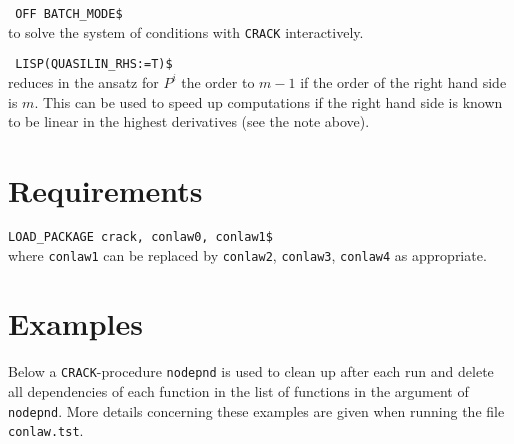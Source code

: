 \documentclass[12pt]{article}
\begin{document}
\verb+ OFF BATCH_MODE$+ \\
to solve the system of conditions with {\tt CRACK} interactively.

\verb+ LISP(QUASILIN_RHS:=T)$+ \\
reduces in the ansatz for $P^i$ the order to $m-1$ if the order of the
right hand side is $m$. This can be used to speed up computations if
the right hand side is known to be linear in the highest derivatives
(see the note above).

\section{Requirements}



\verb+LOAD_PACKAGE crack, conlaw0, conlaw1$+ \\
where \verb+conlaw1+ can be replaced by
\verb+conlaw2+, \verb+conlaw3+, \verb+conlaw4+ as appropriate.

\section{Examples}
Below a {\tt CRACK}-procedure {\tt nodepnd} is used to clean up
after each run and delete all dependencies of each
function in the list of functions in the argument of {\tt nodepnd}.
More details concerning these examples are given when running
the file {\tt conlaw.tst}.
\end{document}
